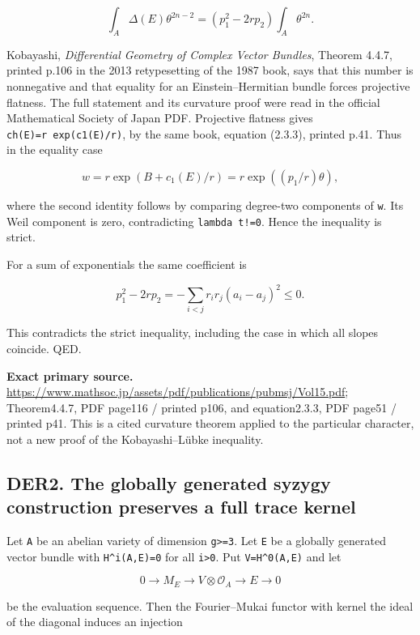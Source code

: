 \documentclass[11pt,a4paper]{article}
\theoremstyle{definition}
\begin{document}
\[
 \int_A\Delta(E)\theta^{2n-2}
 =(p_1^2-2rp_2)\int_A\theta^{2n}.
\]

Kobayashi, \emph{Differential Geometry of Complex Vector Bundles},
Theorem 4.4.7, printed p.106 in the 2013 retypesetting of the 1987 book,
says that this number is nonnegative and that equality for an
Einstein--Hermitian bundle forces projective flatness. The full
statement and its curvature proof were read in the official Mathematical
Society of Japan PDF. Projective flatness gives
\texttt{ch(E)=r\ exp(c1(E)/r)}, by the same book, equation (2.3.3),
printed p.41. Thus in the equality case

\[
 w=r\exp(B+c_1(E)/r)
   =r\exp((p_1/r)\theta),
\]

where the second identity follows by comparing degree-two components of
\texttt{w}. Its Weil component is zero, contradicting
\texttt{lambda\ t!=0}. Hence the inequality is strict.

For a sum of exponentials the same coefficient is

\[
 p_1^2-2rp_2
 =-\sum_{i<j}r_i r_j(a_i-a_j)^2\le0.
\]

This contradicts the strict inequality, including the case in which all
slopes coincide. QED.

\textbf{Exact primary source.}
\url{https://www.mathsoc.jp/assets/pdf/publications/pubmsj/Vol15.pdf};
Theorem4.4.7, PDF page116 / printed p106, and equation2.3.3, PDF page51
/ printed p41. This is a cited curvature theorem applied to the
particular character, not a new proof of the Kobayashi--Lübke
inequality.

\subsection{DER2. The globally generated syzygy construction preserves a
full trace
kernel}\label{derived-candidates-der2.-the-globally-generated-syzygy-construction-preserves-a-full-trace-kernel}

Let \texttt{A} be an abelian variety of dimension
\texttt{g\textgreater{}=3}. Let \texttt{E} be a globally generated
vector bundle with \texttt{H\^{}i(A,E)=0} for all
\texttt{i\textgreater{}0}. Put \texttt{V=H\^{}0(A,E)} and let

\[
 0\longrightarrow M_E\longrightarrow V\otimes\mathcal O_A
 \longrightarrow E\longrightarrow0
\tag{DER2a}
\]

be the evaluation sequence. Then the Fourier--Mukai functor with kernel
the ideal of the diagonal induces an injection
\end{document}
